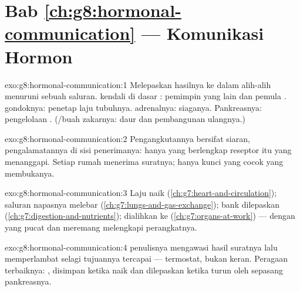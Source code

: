 \section*{Bab \ref{ch:g8:hormonal-communication} --- Komunikasi Hormon}

\begin{solution}{exo:g8:hormonal-communication:1}
Melepaskan hasilnya ke dalam  alih-alih menuruni sebuah
saluran.  kendali di dasar : pemimpin yang
lain dan pemula .  gondoknya: penetap laju
tubuhnya.  adrenalnya:  siaganya. Pankreasnya:
pengelolaan  . (/buah zakarnya:
 daur dan pembangunan ulangnya.)
\end{solution}

\begin{solution}{exo:g8:hormonal-communication:2}
Pengangkutannya bersifat siaran, pengalamatannya di sisi
penerimanya: hanya  yang berlengkap reseptor  itu
yang menanggapi. Setiap rumah menerima suratnya; hanya kunci
yang cocok yang membukanya.
\end{solution}

\begin{solution}{exo:g8:hormonal-communication:3}
Laju  naik (\cref{ch:g7:heart-and-circulation});
saluran napasnya melebar
(\cref{ch:g7:lungs-and-gas-exchange}); bank  
dilepaskan (\cref{ch:g7:digestion-and-nutrients}); 
dialihkan ke  (\cref{ch:g7:organs-at-work}) ---
dengan  yang pucat dan meremang melengkapi perangkatnya.
\end{solution}

\begin{solution}{exo:g8:hormonal-communication:4}
 penulisnya mengawasi hasil suratnya lalu
memperlambat selagi tujuannya tercapai --- termostat, bukan
keran. Peragaan terbaiknya:  , disimpan ketika
naik dan dilepaskan ketika turun oleh sepasang 
pankreasnya.
\end{solution}

